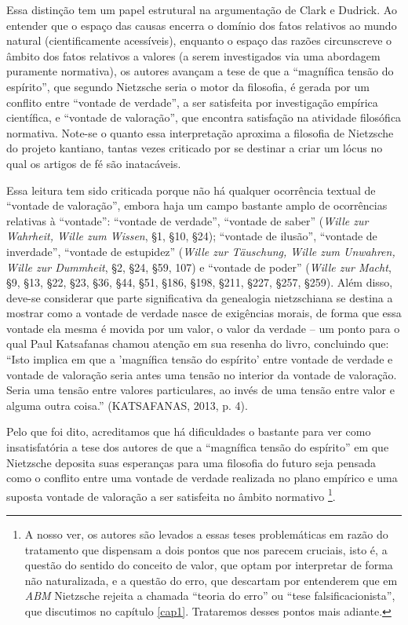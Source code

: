 \documentclass[
	12pt,				%
	openright,			%
	oneside,			%
	a4paper,			%
	english,			%
	french,				%
	spanish,			%
	brazil				%
	]{abntex2}
\begin{document}
Essa distinção tem um papel estrutural na argumentação de Clark e Dudrick. Ao entender que o espaço das causas encerra o domínio dos fatos relativos ao mundo natural (cientificamente acessíveis), enquanto o espaço das razões circunscreve o âmbito dos fatos relativos a valores (a serem investigados via uma abordagem puramente normativa), os autores avançam a tese de que a “magnífica tensão do espírito”, que segundo Nietzsche seria o motor da filosofia, é gerada por um conflito entre “vontade de verdade”, a ser satisfeita por investigação empírica científica, e “vontade de valoração”, que encontra satisfação na atividade filosófica normativa. Note-se o quanto essa interpretação aproxima a filosofia de Nietzsche do projeto kantiano, tantas vezes criticado por se destinar a criar um lócus no qual os artigos de fé são inatacáveis.

	Essa leitura tem sido criticada porque não há qualquer ocorrência textual de “vontade de valoração”, embora haja um campo bastante amplo de ocorrências relativas à “vontade”: “vontade de verdade”, “vontade de saber” (\textit{Wille zur Wahrheit, Wille zum Wissen}, §1, §10, §24); “vontade de ilusão”, “vontade de inverdade”, “vontade de estupidez” (\textit{Wille zur Täuschung, Wille zum Unwahren, Wille zur Dummheit}, §2, §24, §59, 107) e “vontade de poder” (\textit{Wille zur Macht}, §9, §13, §22, §23, §36, §44, §51, §186, §198, §211, §227, §257, §259). Além disso, deve-se considerar que parte significativa da genealogia nietzschiana se destina a mostrar como a vontade de verdade nasce de exigências morais, de forma que essa vontade ela mesma é movida por um valor, o valor da verdade – um ponto para o qual Paul Katsafanas chamou atenção em sua resenha do livro, concluindo que: “Isto implica em que a 'magnífica tensão do espírito' entre vontade de verdade e vontade de valoração seria antes uma tensão no interior da vontade de valoração. Seria uma tensão entre valores particulares, ao invés de uma tensão entre valor e alguma outra coisa.” (KATSAFANAS, 2013, p. 4). 
	
	Pelo que foi dito, acreditamos que há dificuldades o bastante para ver como insatisfatória a tese dos autores de que a “magnífica tensão do espírito” em que Nietzsche deposita suas esperanças para uma filosofia do futuro seja pensada como o conflito entre uma vontade de verdade realizada no plano empírico e uma suposta vontade de valoração a ser satisfeita no âmbito normativo
\footnote{A nosso ver, os autores são levados a essas teses problemáticas em razão do tratamento que dispensam a dois pontos que nos parecem cruciais, isto é, a questão do sentido do conceito de valor, que optam por interpretar de forma não naturalizada, e a questão do erro, que descartam por entenderem que em \textit{ABM} Nietzsche rejeita a chamada “teoria do erro” ou “tese falsificacionista”, que discutimos no capítulo \ref{cap1}. Trataremos desses pontos mais adiante.}. 
\end{document}
